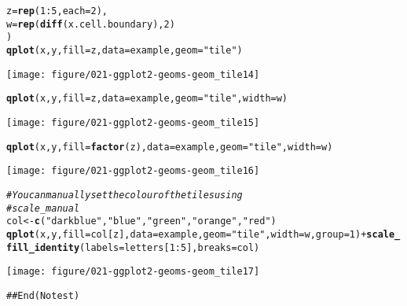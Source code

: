 \documentclass[a4paper,titlepage]{tufte-handout}\usepackage[]{graphicx}\usepackage[]{color}
\makeatletter
\def\maxwidth{ %
  \ifdim\Gin@nat@width>\linewidth
    \linewidth
  \else
    \Gin@nat@width
  \fi
}
\newcommand{\hlnum}[1]{\textcolor[rgb]{0.686,0.059,0.569}{#1}}%
\newcommand{\hlstr}[1]{\textcolor[rgb]{0.192,0.494,0.8}{#1}}%
\newcommand{\hlcom}[1]{\textcolor[rgb]{0.678,0.584,0.686}{\textit{#1}}}%
\newcommand{\hlopt}[1]{\textcolor[rgb]{0,0,0}{#1}}%
\newcommand{\hlstd}[1]{\textcolor[rgb]{0.345,0.345,0.345}{#1}}%
\newcommand{\hlkwb}[1]{\textcolor[rgb]{0.69,0.353,0.396}{#1}}%
\newcommand{\hlkwc}[1]{\textcolor[rgb]{0.333,0.667,0.333}{#1}}%
\newcommand{\hlkwd}[1]{\textcolor[rgb]{0.737,0.353,0.396}{\textbf{#1}}}%
\newenvironment{kframe}{%
 \def\at@end@of@kframe{}%
 \ifinner\ifhmode%
  \def\at@end@of@kframe{\end{minipage}}%
  \begin{minipage}{\columnwidth}%
 \fi\fi%
 \def\FrameCommand##1{\hskip\@totalleftmargin \hskip-\fboxsep
 \colorbox{shadecolor}{##1}\hskip-\fboxsep
     \hskip-\linewidth \hskip-\@totalleftmargin \hskip\columnwidth}%
 \MakeFramed {\advance\hsize-\width
   \@totalleftmargin\z@ \linewidth\hsize
   \@setminipage}}%
 {\par\unskip\endMakeFramed%
 \at@end@of@kframe}
\newenvironment{knitrout}{}{} %
\makeatother
\begin{document}
\begin{knitrout}
\begin{kframe}
\begin{alltt}
  \hlkwc{z} \hlstd{=} \hlkwd{rep}\hlstd{(}\hlnum{1}\hlopt{:}\hlnum{5}\hlstd{,} \hlkwc{each}\hlstd{=}\hlnum{2}\hlstd{),}
  \hlkwc{w} \hlstd{=} \hlkwd{rep}\hlstd{(}\hlkwd{diff}\hlstd{(x.cell.boundary),} \hlnum{2}\hlstd{)}
\hlstd{)}
\hlkwd{qplot}\hlstd{(x, y,} \hlkwc{fill}\hlstd{=z,} \hlkwc{data}\hlstd{=example,} \hlkwc{geom}\hlstd{=}\hlstr{"tile"}\hlstd{)}
\end{alltt}
\end{kframe}
\texttt{[image: figure/021-ggplot2-geoms-geom\_tile14]} 
\begin{kframe}\begin{alltt}
\hlkwd{qplot}\hlstd{(x, y,} \hlkwc{fill}\hlstd{=z,} \hlkwc{data}\hlstd{=example,} \hlkwc{geom}\hlstd{=}\hlstr{"tile"}\hlstd{,} \hlkwc{width}\hlstd{=w)}
\end{alltt}
\end{kframe}
\texttt{[image: figure/021-ggplot2-geoms-geom\_tile15]} 
\begin{kframe}\begin{alltt}
\hlkwd{qplot}\hlstd{(x, y,} \hlkwc{fill}\hlstd{=}\hlkwd{factor}\hlstd{(z),} \hlkwc{data}\hlstd{=example,} \hlkwc{geom}\hlstd{=}\hlstr{"tile"}\hlstd{,} \hlkwc{width}\hlstd{=w)}
\end{alltt}
\end{kframe}
\texttt{[image: figure/021-ggplot2-geoms-geom\_tile16]} 
\begin{kframe}\begin{alltt}
\hlcom{# You can manually set the colour of the tiles using}
\hlcom{# scale_manual}
\hlstd{col} \hlkwb{<-} \hlkwd{c}\hlstd{(}\hlstr{"darkblue"}\hlstd{,} \hlstr{"blue"}\hlstd{,} \hlstr{"green"}\hlstd{,} \hlstr{"orange"}\hlstd{,} \hlstr{"red"}\hlstd{)}
\hlkwd{qplot}\hlstd{(x, y,} \hlkwc{fill}\hlstd{=col[z],} \hlkwc{data}\hlstd{=example,} \hlkwc{geom}\hlstd{=}\hlstr{"tile"}\hlstd{,} \hlkwc{width}\hlstd{=w,} \hlkwc{group}\hlstd{=}\hlnum{1}\hlstd{)} \hlopt{+} \hlkwd{scale_fill_identity}\hlstd{(}\hlkwc{labels}\hlstd{=letters[}\hlnum{1}\hlopt{:}\hlnum{5}\hlstd{],} \hlkwc{breaks}\hlstd{=col)}
\end{alltt}
\end{kframe}
\texttt{[image: figure/021-ggplot2-geoms-geom\_tile17]} 
\begin{kframe}\begin{alltt}
## End(No test)


\end{alltt}
\end{kframe}
\end{knitrout}
\end{document}
